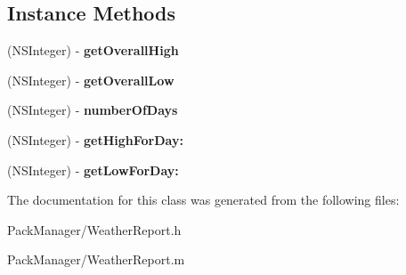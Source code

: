 \subsection*{Instance Methods}
\begin{DoxyCompactItemize}
\item 
\hypertarget{interface_weather_report_aa6bbf5b779e0c4598e198adfeef73caa}{(N\-S\-Integer) -\/ {\bfseries get\-Overall\-High}}\label{interface_weather_report_aa6bbf5b779e0c4598e198adfeef73caa}

\item 
\hypertarget{interface_weather_report_a8044a91695febcfbd290533f0a2d7014}{(N\-S\-Integer) -\/ {\bfseries get\-Overall\-Low}}\label{interface_weather_report_a8044a91695febcfbd290533f0a2d7014}

\item 
\hypertarget{interface_weather_report_a43c87e18a2a90ba36e4426e066ec1bc0}{(N\-S\-Integer) -\/ {\bfseries number\-Of\-Days}}\label{interface_weather_report_a43c87e18a2a90ba36e4426e066ec1bc0}

\item 
\hypertarget{interface_weather_report_a2f163b73346d557e8e69f1ba4658fd6a}{(N\-S\-Integer) -\/ {\bfseries get\-High\-For\-Day\-:}}\label{interface_weather_report_a2f163b73346d557e8e69f1ba4658fd6a}

\item 
\hypertarget{interface_weather_report_a69f1a204d1941aeab765e2ca4bfd989c}{(N\-S\-Integer) -\/ {\bfseries get\-Low\-For\-Day\-:}}\label{interface_weather_report_a69f1a204d1941aeab765e2ca4bfd989c}

\end{DoxyCompactItemize}


The documentation for this class was generated from the following files\-:\begin{DoxyCompactItemize}
\item 
Pack\-Manager/Weather\-Report.\-h\item 
Pack\-Manager/Weather\-Report.\-m\end{DoxyCompactItemize}
